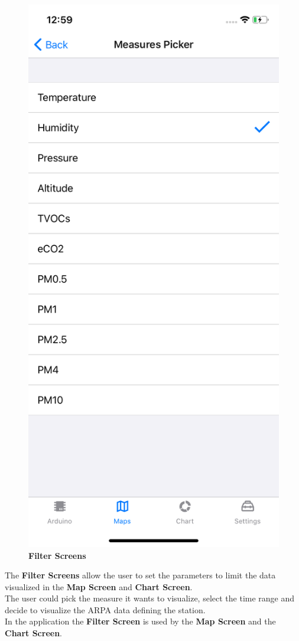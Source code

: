 \begin{figure}[H]
\includegraphics[height=.6\textheight]{./img/ui/mea_picker.png}
\caption{\textbf{Filter Screens}}
\end{figure}
\begin{center}
The \textbf{Filter Screens} allow the user to set the parameters to limit the data visualized in the \textbf{Map Screen} and \textbf{Chart Screen}.\\
The user could pick the measure it wants to visualize, select the time range and decide to visualize the ARPA data defining the station.\\
In the application the \textbf{Filter Screen} is used by the \textbf{Map Screen} and the \textbf{Chart Screen}.
\end{center}

